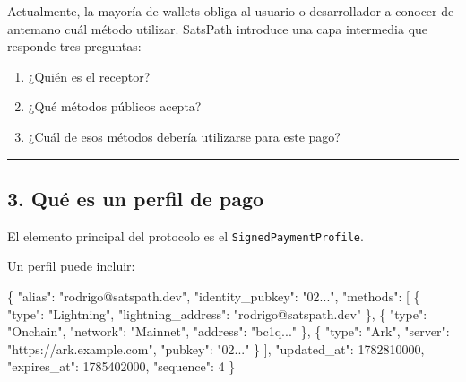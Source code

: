 \documentclass[
]{article}
\newenvironment{Shaded}{}{}
\newcommand{\DataTypeTok}[1]{\textcolor[rgb]{0.56,0.13,0.00}{#1}}
\newcommand{\DecValTok}[1]{\textcolor[rgb]{0.25,0.63,0.44}{#1}}
\newcommand{\FunctionTok}[1]{\textcolor[rgb]{0.02,0.16,0.49}{#1}}
\newcommand{\OtherTok}[1]{\textcolor[rgb]{0.00,0.44,0.13}{#1}}
\newcommand{\StringTok}[1]{\textcolor[rgb]{0.25,0.44,0.63}{#1}}
\providecommand{\tightlist}{%
  \setlength{\itemsep}{0pt}\setlength{\parskip}{0pt}}
\begin{document}
Actualmente, la mayoría de wallets obliga al usuario o desarrollador a
conocer de antemano cuál método utilizar. SatsPath introduce una capa
intermedia que responde tres preguntas:

\begin{enumerate}
\def\labelenumi{\arabic{enumi}.}
\tightlist
\item
  ¿Quién es el receptor?
\item
  ¿Qué métodos públicos acepta?
\item
  ¿Cuál de esos métodos debería utilizarse para este pago?
\end{enumerate}

\begin{center}\rule{0.5\linewidth}{0.5pt}\end{center}

\hypertarget{quuxe9-es-un-perfil-de-pago}{%
\subsection{3. Qué es un perfil de
pago}\label{quuxe9-es-un-perfil-de-pago}}

El elemento principal del protocolo es el \texttt{SignedPaymentProfile}.

Un perfil puede incluir:

\begin{Shaded}
\begin{Highlighting}[]
\FunctionTok{\{}
  \DataTypeTok{"alias"}\FunctionTok{:} \StringTok{"rodrigo@satspath.dev"}\FunctionTok{,}
  \DataTypeTok{"identity\_pubkey"}\FunctionTok{:} \StringTok{"02..."}\FunctionTok{,}
  \DataTypeTok{"methods"}\FunctionTok{:} \OtherTok{[}
    \FunctionTok{\{}
      \DataTypeTok{"type"}\FunctionTok{:} \StringTok{"Lightning"}\FunctionTok{,}
      \DataTypeTok{"lightning\_address"}\FunctionTok{:} \StringTok{"rodrigo@satspath.dev"}
    \FunctionTok{\}}\OtherTok{,}
    \FunctionTok{\{}
      \DataTypeTok{"type"}\FunctionTok{:} \StringTok{"Onchain"}\FunctionTok{,}
      \DataTypeTok{"network"}\FunctionTok{:} \StringTok{"Mainnet"}\FunctionTok{,}
      \DataTypeTok{"address"}\FunctionTok{:} \StringTok{"bc1q..."}
    \FunctionTok{\}}\OtherTok{,}
    \FunctionTok{\{}
      \DataTypeTok{"type"}\FunctionTok{:} \StringTok{"Ark"}\FunctionTok{,}
      \DataTypeTok{"server"}\FunctionTok{:} \StringTok{"https://ark.example.com"}\FunctionTok{,}
      \DataTypeTok{"pubkey"}\FunctionTok{:} \StringTok{"02..."}
    \FunctionTok{\}}
  \OtherTok{]}\FunctionTok{,}
  \DataTypeTok{"updated\_at"}\FunctionTok{:} \DecValTok{1782810000}\FunctionTok{,}
  \DataTypeTok{"expires\_at"}\FunctionTok{:} \DecValTok{1785402000}\FunctionTok{,}
  \DataTypeTok{"sequence"}\FunctionTok{:} \DecValTok{4}
\FunctionTok{\}}
\end{Highlighting}
\end{Shaded}
\end{document}
